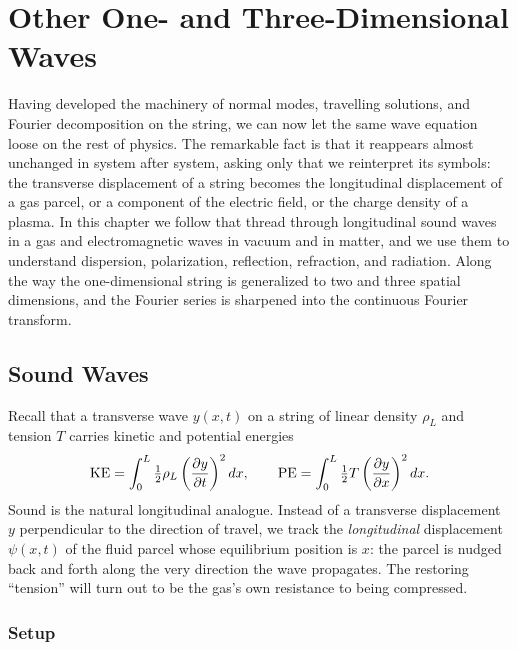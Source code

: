 \chapter{Other One- and Three-Dimensional Waves}

Having developed the machinery of normal modes, travelling solutions, and Fourier decomposition on the string, we can now let the same wave equation loose on the rest of physics. The remarkable fact is that it reappears almost unchanged in system after system, asking only that we reinterpret its symbols: the transverse displacement of a string becomes the longitudinal displacement of a gas parcel, or a component of the electric field, or the charge density of a plasma. In this chapter we follow that thread through longitudinal sound waves in a gas and electromagnetic waves in vacuum and in matter, and we use them to understand dispersion, polarization, reflection, refraction, and radiation. Along the way the one-dimensional string is generalized to two and three spatial dimensions, and the Fourier series is sharpened into the continuous Fourier transform.

\section{Sound Waves}

Recall that a transverse wave $y(x,t)$ on a string of linear density $\rho_L$ and tension $T$ carries kinetic and potential energies
\begin{equation}
    \mathrm{KE} = \int_0^L \tfrac{1}{2}\rho_L\left(\pdv{y}{t}\right)^2 dx, \qquad
    \mathrm{PE} = \int_0^L \tfrac{1}{2} T\left(\pdv{y}{x}\right)^2 dx.
\end{equation}
Sound is the natural longitudinal analogue. Instead of a transverse displacement $y$ perpendicular to the direction of travel, we track the \emph{longitudinal} displacement $\psi(x,t)$ of the fluid parcel whose equilibrium position is $x$: the parcel is nudged back and forth along the very direction the wave propagates. The restoring ``tension'' will turn out to be the gas's own resistance to being compressed.

\subsection{Setup}

